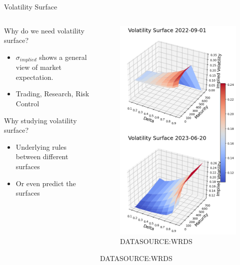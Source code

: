 \documentclass{beamer}
\begin{document}
\begin{frame}{Volatility Surface}
\begin{columns}
    \begin{column}{0.46\textwidth}
        Why do we need volatility surface?
        \begin{itemize}
            \item $\sigma_{implied}$ shows a general view of market expectation.
            \item Trading, Research, Risk Control
        \end{itemize}
        \vspace{0.5cm}
        Why studying volatility surface?
        \begin{itemize}
            \item Underlying rules between different surfaces
            \item Or even predict the surfaces
        \end{itemize}
    \end{column}
    
    \begin{column}{0.48\textwidth}
    
\begin{figure}
    \centering
    \includegraphics[width=0.65\linewidth]{docs/slides/img/vol_sample.png}
    \caption{DATASOURCE:WRDS}
    \label{fig:enter-label}
\end{figure}
DATASOURCE:WRDS
    \end{column}
\end{columns}

\end{frame}
\end{document}
